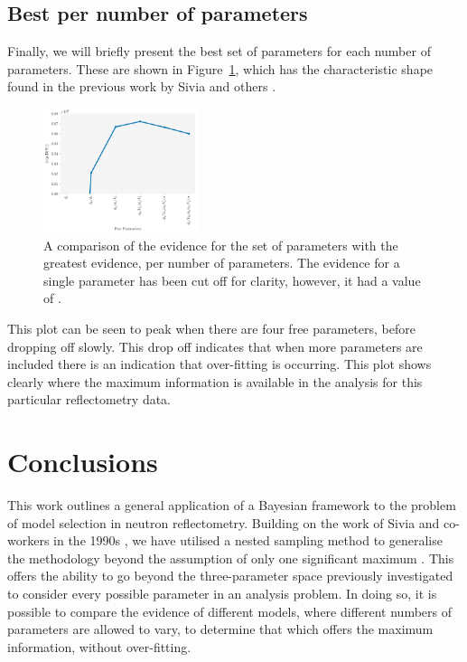 \documentclass[
 reprint,
 superscriptaddress,
 amsmath,amssymb,
 aps,
]{revtex4-1}
\begin{document}
\subsection{Best per number of parameters}

Finally, we will briefly present the best set of parameters for each number of parameters. 
These are shown in Figure~\ref{fig:best_per}, which has the characteristic shape found in the previous work by Sivia and others \cite{sivia_analysis_1991,sivia_introduction_1993,sivia_bayesian_1998,sivia_data_2005}. 
%
\begin{figure}
\includegraphics[width=0.4\textwidth]{best_per}
\caption{\label{fig:best_per} A comparison of the evidence for the set of parameters with the greatest evidence, per number of parameters. The evidence for a single parameter has been cut off for clarity, however, it had a value of \protect.}
\end{figure}
%
This plot can be seen to peak when there are four free parameters, before dropping off slowly. 
This drop off indicates that when more parameters are included there is an indication that over-fitting is occurring. 
This plot shows clearly where the maximum information is available in the analysis for this particular reflectometry data. 

\section{\label{conclusions} Conclusions}

This work outlines a general application of a Bayesian framework to the problem of model selection in neutron reflectometry. 
Building on the work of Sivia and co-workers in the 1990s \cite{sivia_bayesian_1998}, we have utilised a nested sampling method to generalise the methodology beyond the assumption of only one significant maximum \cite{sivia_analysis_1991}. 
This offers the ability to go beyond the three-parameter space previously investigated to consider every possible parameter in an analysis problem.
In doing so, it is possible to compare the evidence of different models, where different numbers of parameters are allowed to vary, to determine that which offers the maximum information, without over-fitting. 
\end{document}
